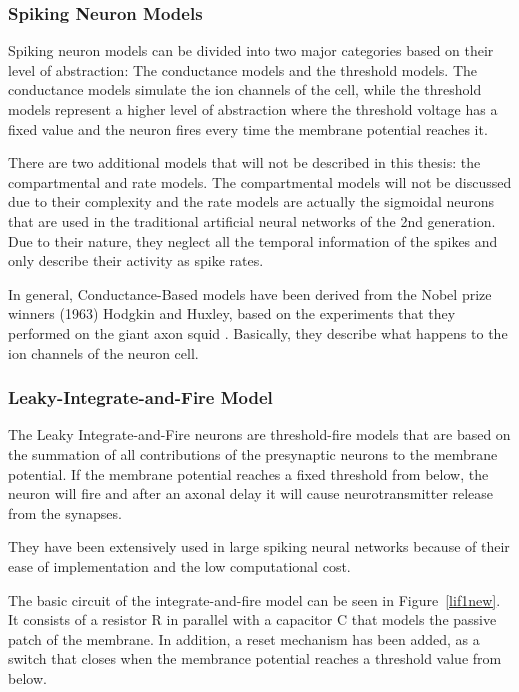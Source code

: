 \subsubsection{Spiking Neuron Models}

Spiking neuron models can be divided into two major categories \cite{gernstbook} based on their level of abstraction: The conductance models and the threshold models. The conductance models simulate the ion channels of the cell, while the threshold models represent a higher level of abstraction where the threshold voltage has a fixed value and the neuron fires every time the membrane potential reaches it.

	There are two additional models that will not be described in this thesis: the compartmental and rate models. The compartmental models will not be discussed due to their complexity and the rate models are actually the sigmoidal neurons that are used in the traditional artificial neural networks of the 2nd generation. Due to their nature, they neglect all the temporal information of the spikes and only describe their activity as spike rates.

In general, Conductance-Based models have been derived from the Nobel prize winners (1963) Hodgkin and Huxley, based on the experiments that they performed on the giant axon squid \cite{hhmodel}. Basically, they describe what happens to the ion channels of the neuron cell. 

\subsubsection{Leaky-Integrate-and-Fire Model}

The Leaky Integrate-and-Fire neurons are threshold-fire models that are based on the summation of all contributions of the presynaptic neurons to the membrane potential. If the membrane potential reaches a fixed threshold from below, the neuron will fire and after an axonal delay it will cause neurotransmitter release from the synapses. 

They have been extensively used in large spiking neural networks \cite{Delorme1999989} because of their ease of implementation and the low computational cost.

The basic circuit of the integrate-and-fire model can be seen in Figure~\ref{lif1new}. It consists of a resistor R in parallel with a capacitor C that models the passive patch of the membrane. In addition, a reset mechanism has been added, as a switch that closes when the membrance potential reaches a threshold value from below. 

